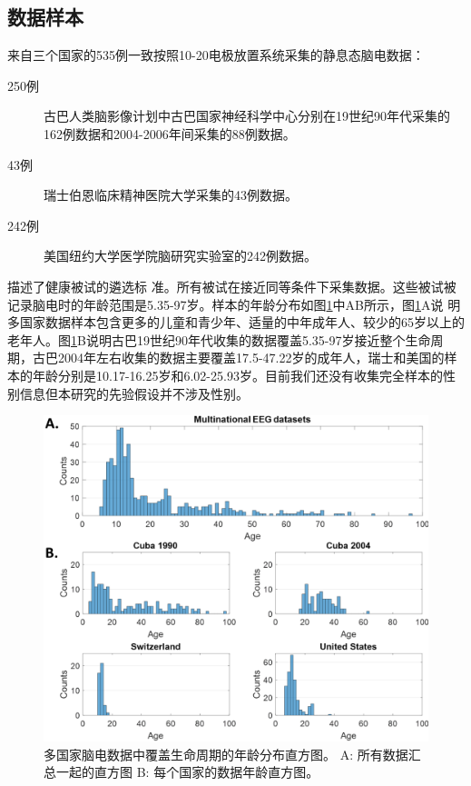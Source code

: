 \subsection{数据样本}
来自三个国家的535例一致按照10-20电极放置系统采集的静息态脑电数据：
\begin{description}
\item[250例] 古巴人类脑影像计划中古巴国家神经科学中心分别在19世纪90年代采集的162例数据和2004-2006年间采集的88例数据。
\item[43例] 瑞士伯恩临床精神医院大学采集的43例数据。
\item[242例] 美国纽约大学医学院脑研究实验室的242例数据。
\end{description}
\cite{john1977neurometrics,alvarez1987eeg,koenig2002millisecond,hernandez-gonzalez_multimodal_2011}描述了健康被试的遴选标
准。所有被试在接近同等条件下采集数据。这些被试被记录脑电时的年龄范围是5.35-97岁。样本的年龄分布如图\ref{age}中AB所示，图\ref{age}A说
明多国家数据样本包含更多的儿童和青少年、适量的中年成年人、较少的65岁以上的老年人。图\ref{age}B说明古巴19世纪90年代收集的数据覆盖5.35-97岁接近整个生命周期，古巴2004年左右收集的数据主要覆盖17.5-47.22岁的成年人，瑞士和美国的样本的年龄分别是10.17-16.25岁和6.02-25.93岁。目前我们还没有收集完全样本的性别信息但本研究的先验假设并不涉及性别。
\begin{figure}[!ht]
\includegraphics[width=15cm]{pic/Norm/figure1.png}
\caption{多国家脑电数据中覆盖生命周期的年龄分布直方图。 A: 所有数据汇总一起的直方图 B: 每个国家的数据年龄直方图。}
\label{age}
\end{figure}

